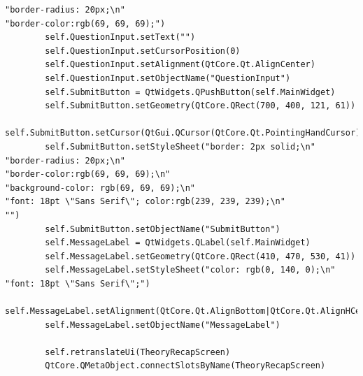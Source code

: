 \documentclass{article}
\begin{document}
\begin{lstlisting}
"border-radius: 20px;\n"
"border-color:rgb(69, 69, 69);")
        self.QuestionInput.setText("")
        self.QuestionInput.setCursorPosition(0)
        self.QuestionInput.setAlignment(QtCore.Qt.AlignCenter)
        self.QuestionInput.setObjectName("QuestionInput")
        self.SubmitButton = QtWidgets.QPushButton(self.MainWidget)
        self.SubmitButton.setGeometry(QtCore.QRect(700, 400, 121, 61))
        self.SubmitButton.setCursor(QtGui.QCursor(QtCore.Qt.PointingHandCursor))
        self.SubmitButton.setStyleSheet("border: 2px solid;\n"
"border-radius: 20px;\n"
"border-color:rgb(69, 69, 69);\n"
"background-color: rgb(69, 69, 69);\n"
"font: 18pt \"Sans Serif\"; color:rgb(239, 239, 239);\n"
"")
        self.SubmitButton.setObjectName("SubmitButton")
        self.MessageLabel = QtWidgets.QLabel(self.MainWidget)
        self.MessageLabel.setGeometry(QtCore.QRect(410, 470, 530, 41))
        self.MessageLabel.setStyleSheet("color: rgb(0, 140, 0);\n"
"font: 18pt \"Sans Serif\";")
        self.MessageLabel.setAlignment(QtCore.Qt.AlignBottom|QtCore.Qt.AlignHCenter)
        self.MessageLabel.setObjectName("MessageLabel")

        self.retranslateUi(TheoryRecapScreen)
        QtCore.QMetaObject.connectSlotsByName(TheoryRecapScreen)


\end{lstlisting}
\end{document}
